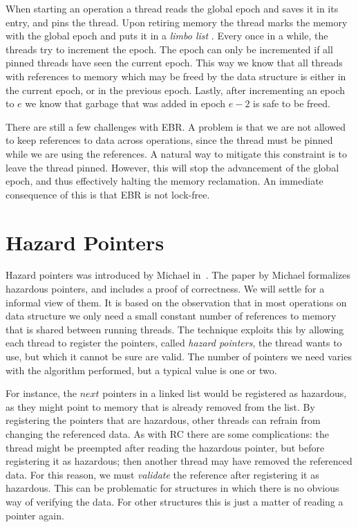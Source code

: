 \documentclass[a4paper,twoside]{report}
\begin{document}
When starting an operation a thread reads the global epoch and saves it in its
entry, and pins the thread.  Upon retiring memory the thread marks the memory
with the global epoch and puts it in a \emph{limbo list} .  Every once in a while, the threads try to
increment the epoch.  The epoch can only be incremented if all pinned threads
have seen the current epoch. This way we know that all threads with references
to memory which may be freed by the data structure is either in the current
epoch, or in the previous epoch.  Lastly, after incrementing an epoch to $e$ we
know that garbage that was added in epoch $e-2$ is safe to be freed.


There are still a few challenges with EBR.  A problem is that we are not
allowed to keep references to data across operations, since the thread must be
pinned while we are using the references.  A natural way to mitigate this
constraint is to leave the thread pinned.  However, this will stop the
advancement of the global epoch, and thus effectively halting the memory
reclamation.  An immediate consequence of this is that EBR is not lock-free.



\section{Hazard Pointers}

Hazard pointers was introduced by Michael in~\cite{michael2004hazard}.
The paper by Michael formalizes hazardous pointers, and includes a proof of
correctness. We will settle for a informal view of them. It is
based on the observation that in most operations on data structure we only need
a small constant number of references to memory that is shared between running
threads. The technique exploits this by allowing each thread to register the
pointers, called \emph{hazard pointers}, the thread wants to use, but which it
cannot be sure are valid. The number of pointers we need varies with the
algorithm performed, but a typical value is one or two.

For instance, the $next$ pointers in a linked list would be registered as
hazardous, as they might point to memory that is already removed from the list.
By registering the pointers that are hazardous, other threads can refrain from
changing the referenced data.  As with RC there are some complications: the
thread might be preempted after reading the hazardous pointer, but before
registering it as hazardous; then another thread may have removed the referenced
data.  For this reason, we must \emph{validate} the reference after registering
it as hazardous. This can be problematic for structures in which there is no
obvious way of verifying the data. For other structures this is just a matter of
reading a pointer again.
\end{document}
